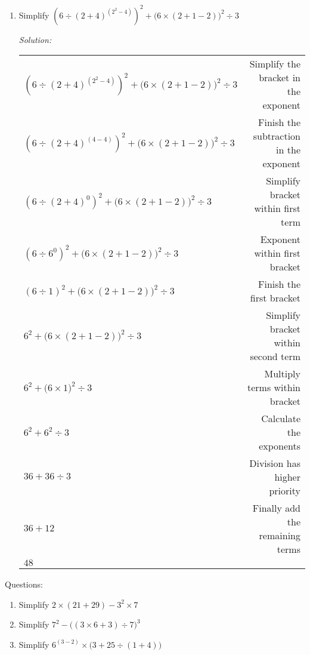 \documentclass[16pt]{article}
\theoremstyle{remark}
\begin{document}
\begin{enumerate}
\begin{mdframed}[style=TheoremFrame]
\end{mdframed}
\item Simplify $\displaystyle{(6\div (2+4)^{(2^2-4)})^2 + \big(6\times(2+1-2)\big)^2 \div 3}$
\begin{mdframed}[style=TheoremFrame]
\textit{Solution:}
\begin{center}
\begin{tabular}{l r}
$\displaystyle{(6\div (2+4)^{(2^2-4)})^2 + \big(6\times(2+1-2)\big)^2 \div 3}$ & Simplify the bracket in the exponent\\
$\displaystyle{(6\div (2+4)^{(4-4)})^2 + \big(6\times(2+1-2)\big)^2 \div 3}$ & Finish the subtraction in the exponent\\
$\displaystyle{(6\div (2+4)^{0})^2 + \big(6\times(2+1-2)\big)^2 \div 3}$ & Simplify bracket within first term\\
$\displaystyle{(6\div 6^{0})^2 + \big(6\times(2+1-2)\big)^2 \div 3}$ & Exponent within first bracket\\
$\displaystyle{(6\div 1)^2 + \big(6\times(2+1-2)\big)^2 \div 3}$ & Finish the first bracket\\
$\displaystyle{6^2 + \big(6\times(2+1-2)\big)^2 \div 3}$ & Simplify bracket within second term\\
$\displaystyle{6^2 + \big(6\times 1 \big)^2 \div 3}$ & Multiply terms within bracket\\
$\displaystyle{6^2 + 6^2 \div 3}$ & Calculate the exponents\\
$\displaystyle{36+ 36 \div 3}$ & Division has higher priority\\
$\displaystyle{36+ 12}$ & Finally add the remaining terms\\
$48$ & 
\end{tabular}
\end{center}
\end{mdframed}
\end{enumerate}
\newpage
Questions:
\begin{enumerate}
\item Simplify $2 \times (21+29) - 3^2 \times 7$
\vspace{6cm}
\item Simplify $7^2 - \big((3\times 6+3)\div 7\big)^3$
\vspace{6cm} 
\item Simplify $\displaystyle{6^{(3-2)} \times \big(3+25 \div (1+4) \big)}$
\end{enumerate}
\end{document}
